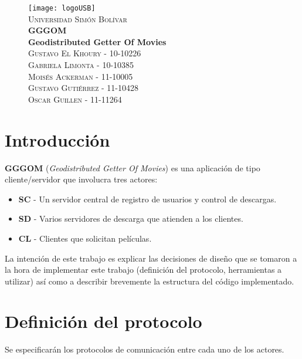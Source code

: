 \documentclass{article}
\begin{document}
\begin{figure}[t]
    \begin{center}
    	\texttt{[image: logoUSB]}\\[0.1cm]
    	\textsc{Universidad Simón Bolívar}\\[0.7cm]
        { \LARGE \bfseries GGGOM}\\[0.4cm]
        { \LARGE \bfseries Geodistributed Getter Of Movies}\\[0.3cm]
        \textsc{Gustavo El Khoury - 10-10226}\\[0.1cm]
        \textsc{Gabriela Limonta - 10-10385}\\[0.1cm]
        \textsc{Moisés Ackerman - 11-10005}\\[0.1cm]
        \textsc{Gustavo Gutiérrez - 11-10428}\\[0.1cm]
        \textsc{Oscar Guillen - 11-11264}\\[0.1cm]
    \end{center}
\end{figure}
\clearpage

\section*{Introducción}

\textbf{GGGOM} (\emph{Geodistributed Getter Of Movies}) es una aplicación de tipo cliente/servidor que involucra tres actores:
\begin{itemize}
	\item \textbf{SC} - Un servidor central de registro de usuarios y control de descargas.
	\item \textbf{SD} - Varios servidores de descarga que atienden a los clientes.
	\item \textbf{CL} - Clientes que solicitan películas.
\end{itemize}

La intención de este trabajo es explicar las decisiones de diseño que se tomaron a la hora de implementar este trabajo (definición del protocolo,
herramientas a utilizar) así como a describir brevemente la estructura del código implementado.
\clearpage
\section*{Definición del protocolo}

Se especificarán los protocolos de comunicación entre cada uno de los actores.
\end{document}
